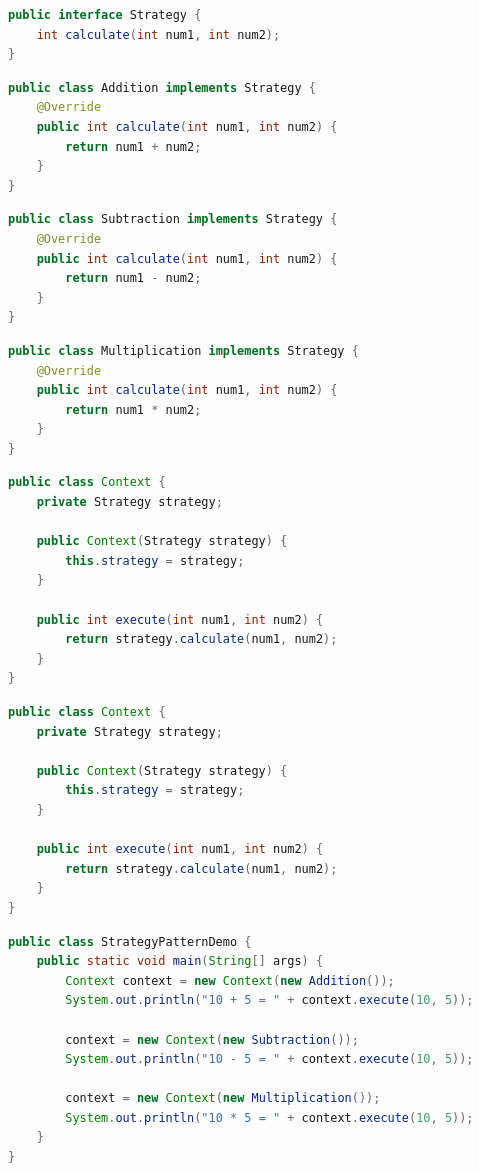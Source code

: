\begin{lstlisting}[language=Java, title=Strategy.java]
public interface Strategy {
    int calculate(int num1, int num2);
}
\end{lstlisting}

\begin{lstlisting}[language=Java, title=Addition.java]
public class Addition implements Strategy {
    @Override
    public int calculate(int num1, int num2) {
        return num1 + num2;
    }
}
\end{lstlisting}

\begin{lstlisting}[language=Java, title=Subtraction.java]
public class Subtraction implements Strategy {
    @Override
    public int calculate(int num1, int num2) {
        return num1 - num2;
    }
}
\end{lstlisting}

\begin{lstlisting}[language=Java, title=Multiplication.java]
public class Multiplication implements Strategy {
    @Override
    public int calculate(int num1, int num2) {
        return num1 * num2;
    }
}
\end{lstlisting}

\begin{lstlisting}[language=Java, title=Context.java]
public class Context {
    private Strategy strategy;

    public Context(Strategy strategy) {
        this.strategy = strategy;
    }

    public int execute(int num1, int num2) {
        return strategy.calculate(num1, num2);
    }
}
\end{lstlisting}
\begin{lstlisting}[language=Java, title=Context.java]
public class Context {
    private Strategy strategy;

    public Context(Strategy strategy) {
        this.strategy = strategy;
    }

    public int execute(int num1, int num2) {
        return strategy.calculate(num1, num2);
    }
}
\end{lstlisting}

\begin{lstlisting}[language=Java, title=StrategyPatternDemo.java]
public class StrategyPatternDemo {
    public static void main(String[] args) {
        Context context = new Context(new Addition());
        System.out.println("10 + 5 = " + context.execute(10, 5));

        context = new Context(new Subtraction());
        System.out.println("10 - 5 = " + context.execute(10, 5));

        context = new Context(new Multiplication());
        System.out.println("10 * 5 = " + context.execute(10, 5));
    }
}
\end{lstlisting}

